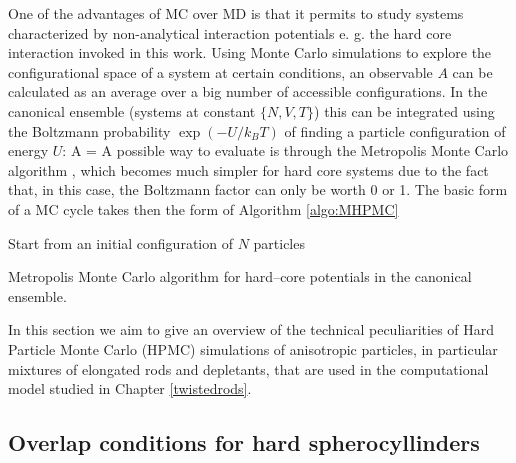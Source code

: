 One of the advantages of MC over MD is that it permits to study systems characterized by non-analytical interaction potentials e. g. the hard core interaction invoked in this work. Using Monte Carlo simulations to explore the configurational space of a system at certain conditions, an observable $A$ can be calculated as an average over a big number of accessible configurations. In the canonical ensemble (systems at constant $\{N,V,T\}$) this can be integrated using the Boltzmann probability $\exp( -U/k_{B}T)$ of finding a particle configuration of energy $U$:
\beq
\langle  A \rangle = 
\label{observable}
\eeq
A possible way to evaluate  is through the Metropolis Monte Carlo algorithm \cite{Metropolis1953}, which becomes much simpler for hard core systems due to the fact that, in this case, the Boltzmann factor can only be worth 0 or 1. The basic form of a MC cycle takes then the form of Algorithm \ref{algo:MHPMC}
\begin{algorithm}[h]
    \SetAlgoLined

    Start from an initial configuration of $N$ particles\;
    \caption{Metropolis Monte Carlo algorithm for hard--core potentials in the canonical ensemble.}
    \label{algo:MHPMC}
\end{algorithm}
In this section we aim to give an overview of the technical peculiarities of Hard Particle Monte Carlo (HPMC) simulations of anisotropic particles, in particular mixtures of elongated rods and depletants, that are used in the computational model studied in Chapter \ref{twistedrods}.

\subsection{Overlap conditions for hard spherocyllinders}

